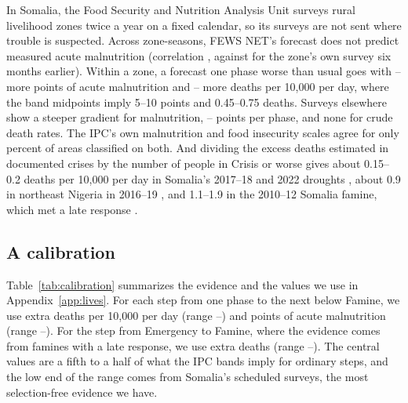\documentclass[11pt]{article}
\begin{document}
\begin{appendices}
In Somalia, the Food Security and Nutrition Analysis Unit surveys rural livelihood zones twice a year on a fixed calendar, so its surveys are not sent where trouble is suspected. Across \fsN{} zone-seasons, FEWS NET's forecast does not predict measured acute malnutrition (correlation \fsCorrFc{}, against \fsCorrLag{} for the zone's own survey six months earlier). Within a zone, a forecast one phase worse than usual goes with \wzGamZoneSeason{}--\wzGamZone{} more points of acute malnutrition and \wzCdrZoneSeason{}--\wzCdrZone{} more deaths per 10,000 per day, where the band midpoints imply 5--10 points and 0.45--0.75 deaths. Surveys elsewhere show a steeper gradient for malnutrition, \spSlope{}--\fdwSlope{} points per phase, and none for crude death rates. The IPC's own malnutrition and food insecurity scales agree for only \amnAnyDiag{} percent of areas classified on both. And dividing the excess deaths estimated in documented crises by the number of people in Crisis or worse gives about 0.15--0.2 deaths per 10,000 per day in Somalia's 2017--18 and 2022 droughts \citep{warsame2023,lshtm2023somalia,ouchtar2026}, about 0.9 in northeast Nigeria in 2016--19 \citep{checchi2023nigeria}, and 1.1--1.9 in the 2010--12 Somalia famine, which met a late response \citep{checchi2013}.

\subsection{A calibration}

Table~\ref{tab:calibration} summarizes the evidence and the values we use in Appendix~\ref{app:lives}. For each step from one phase to the next below Famine, we use \calCdrMid{} extra deaths per 10,000 per day (range \calCdrLo{}--\calCdrHi{}) and \calGamMid{} points of acute malnutrition (range \calGamLo{}--\calGamHi{}). For the step from Emergency to Famine, where the evidence comes from famines with a late response, we use \calFamMid{} extra deaths (range \calFamLo{}--\calFamHi{}). The central values are a fifth to a half of what the IPC bands imply for ordinary steps, and the low end of the range comes from Somalia's scheduled surveys, the most selection-free evidence we have.


\end{appendices}
\end{document}
